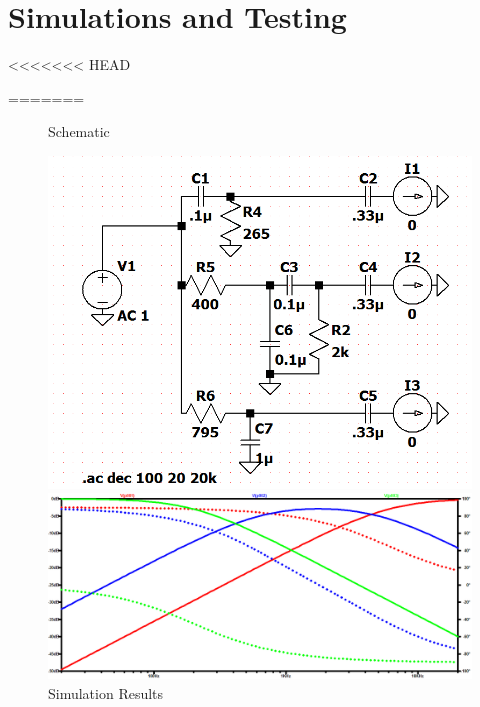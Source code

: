 \documentclass{article}
\begin{document}
\section*{Simulations and Testing}
<<<<<<< HEAD

=======
\begin{figure}[!h]
\centering
\caption{Schematic}
\includegraphics[scale=.5]{lab6_spice_schematic}
\caption{Simulation Results}
\includegraphics[width=\linewidth]{lab6_spice_graph}
\end{figure}
\end{document}
